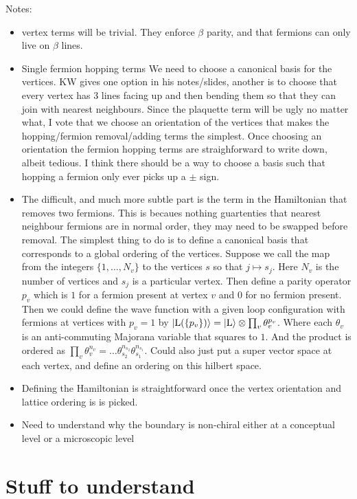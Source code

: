 \documentclass[12pt,a4paper]{article}
\newcommand{\ket}[1]{\ensuremath{\left|#1\right\rangle}}
\begin{document}
Notes:
\begin{itemize}
\item vertex terms will be trivial. They enforce $\beta$ parity, and that fermions can only live on $\beta$ lines. 
\item Single fermion hopping terms
We need to choose a canonical basis for the vertices. KW gives one option in his notes/slides, another is to choose that every vertex has 3 lines facing up and then bending them so that they can join with nearest neighbours. Since the plaquette term will be ugly no matter what, I vote that we choose an orientation of the vertices that makes the hopping/fermion removal/adding terms the simplest. 
Once choosing an orientation the fermion hopping terms are straighforward to write down, albeit tedious. 
I think there should be a way to choose a basis such that hopping a fermion only ever picks up a $\pm$ sign. 
\item The difficult, and much more subtle part is the term in the Hamiltonian that removes two fermions. This is becaues nothing guartenties that nearest neighbour fermions are in normal order, they may need to be swapped before removal. 
The simplest thing to do is to define a canonical basis that corresponds to a global ordering of the vertices.
Suppose we call the map from the integers $\{ 1, \hdots, N_v \}$ to the vertices $s$ so that $j \mapsto s_j$. Here $N_v$ is the number of vertices and $s_j$ is a particular vertex. 
Then define a parity operator $p_v$ which is $1$ for a fermion present at vertex $v$ and $0$ for no fermion present. Then we could define the wave function with a given loop configuration { } with fermions at vertices with $p_v =1$ by $\ket{\text{\cal L}(\{p_v \}) } = \ket{\text{\cal L}} \otimes \prod_v \theta_v^{p_v}$. 
Where each $\theta_v$ is an anti-commuting Majorana variable that squares to $1$. And the product is ordered as $\prod_v \theta_v^{n_v} =\hdots \theta_{s_2}^{n_{s_2}} \theta_{s_1}^{n_{s_1}}$.
Could also just put a super vector space at each vertex, and define an ordering on this hilbert space. 
\item Defining the Hamiltonian is straightforward once the vertex orientation and lattice ordering is is picked.  
\item Need to understand why the boundary is non-chiral either at a conceptual level or a microscopic level
\end{itemize}

\section{Stuff to understand}
\end{document}
